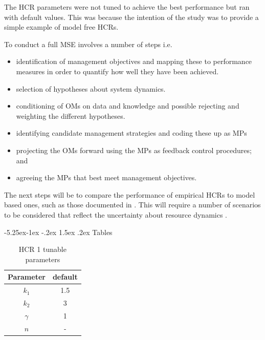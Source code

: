 \documentclass[a4paper, 10pt]{article}
\makeatletter
\renewcommand{\section}{\@startsection{section}{1}{\z@}%
 {-5.25ex\@plus -1ex \@minus -.2ex}%
 {1.5ex \@plus .2ex}%
 {\normalfont\bfseries}}
\makeatother
\begin{document}
The HCR parameters were not tuned to achieve the best performance 
but ran with default values. This was because the intention of the study was to provide a simple example of model 
free HCRs. 

To conduct a full MSE involves a number of steps \citep[][]{punt2007developing} i.e.

\begin{itemize}
 \item identification of management objectives and mapping these to performance measures in order to quantify how well they have been achieved.
 \item selection of hypotheses about system dynamics.
 \item conditioning of OMs on data and knowledge and possible rejecting and weighting the different hypotheses.
 \item identifying candidate management strategies and coding these up as MPs %
 \item projecting the OMs forward using the MPs as feedback control procedures; and
 \item agreeing the MPs that best meet  management objectives.
\end{itemize}

The next steps will be to compare the performance of empirical HCRs to model based ones, such as those documented in \cite{kell2013mpalbn,
kell2013msealbn}. This will require a number of scenarios to be considered that reflect the uncertainty about 
resource dynamics \citep[e.g.][]{fromentin2014spectre,leach2014elicit,kell2014bftuncert,kell2014chicken}.

\newpage\clearpage
 
 

\newpage\clearpage\section{Tables}

\begin{table}[ht]
\begin{center}
\begin{tabular}{|cc|}
\hline
Parameter & default\\
\hline\hline
$k_1$ & 1.5\\
$k_2$ & 3\\
$\gamma$ & 1\\
$n$ & -\\
\hline
\end{tabular}
\end{center}
\caption{HCR 1 tunable parameters}
\label{tab1}
\end{table}
\end{document}
